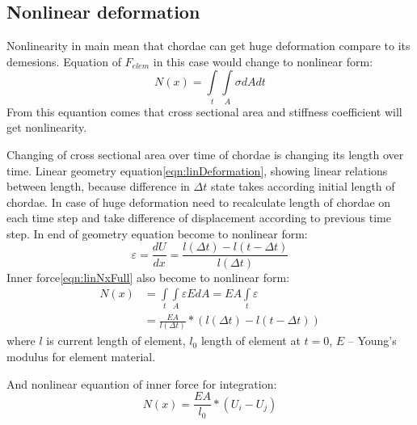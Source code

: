 \subsection*{Nonlinear deformation}
Nonlinearity in main mean that chordae can get huge deformation compare to
its demesions. Equation of $F_{elem}$ in this case  would change to
nonlinear form:
\begin{equation}\label{eqn:nonlinNx}
  N(x)= \int\limits_t\int\limits_A \sigma dAdt
\end{equation}
From this equantion comes that cross sectional area and stiffness coefficient
will get nonlinearity.
\par
Changing of cross sectional area over time of chordae is changing its length
over time. Linear geometry equation\eqref{eqn:linDeformation}, showing linear
relations between length, because difference in $\Delta t$ state takes according
initial length of chordae. In case of huge deformation need to recalculate
length of chordae on each time step and take difference of displacement
according to previous time step. In end of geometry equation become to nonlinear
form:
\begin{equation}\label{eqn:nonlinDeformation}
  \varepsilon=\frac{dU}{dx}=\frac{l(\Delta t)-l(t-\Delta t)}{l(\Delta t)}
\end{equation}
Inner force\eqref{eqn:linNxFull} also become to nonlinear form:
\begin{equation}\label{eqn:nonlinNxFull}
  \begin{split}
    N(x) &=  \int\limits_t\int\limits_A \varepsilon EdA=EA\int\limits_t\varepsilon \\
    &=\frac{EA}{l(\Delta t)}*(l(\Delta t)-l(t-\Delta t))
  \end{split}
\end{equation}
where $l$ is current length of element, $l_0$ length of element at $t=0$, $E$ –
Young’s modulus for element material.

And nonlinear equantion of inner force for integration:
\begin{equation}\label{eqn:nonlinNxWdispl}
  N(x)=\frac{EA}{l_0}*(U_{i}-U_{j})
\end{equation}\par
